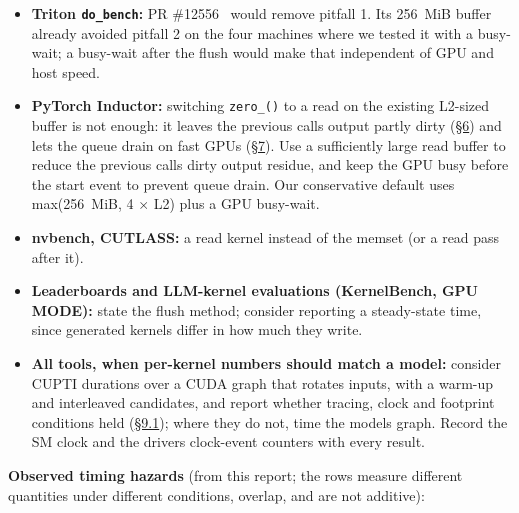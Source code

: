 \documentclass[11pt,a4paper]{article}
\providecommand{\tightlist}{\setlength{\itemsep}{0pt}\setlength{\parskip}{0pt}}
\begin{document}
\begin{itemize}
\tightlist
\item
  \textbf{Triton \texttt{do\_\allowbreak{}bench}:} PR \#12556~\cite{tr12556} would remove pitfall 1. Its 256~MiB buffer already avoided pitfall 2 on the four
  machines where we tested it with a busy-wait; a busy-wait after the flush would make that independent of GPU and
  host speed.
\item
  \textbf{PyTorch Inductor:} switching \texttt{zero\_\allowbreak{}()} to a read on the existing L2-sized buffer is not enough: it leaves the
  previous call\textquotesingle s output partly dirty (\hyperref[what-removes-the-residue-and-what-does-not]{\S{}6}) and lets the queue drain on fast GPUs (\hyperref[pitfall-2-queue-drain]{\S{}7}). Use a sufficiently large
  read buffer to reduce the previous call\textquotesingle s dirty output residue, and keep the GPU busy before the start event to
  prevent queue drain. Our conservative default uses max(256~MiB, 4 \ensuremath{\times} L2) plus a GPU busy-wait.
\item
  \textbf{nvbench, CUTLASS:} a read kernel instead of the memset (or a read pass after it).
\item
  \textbf{Leaderboards and LLM-kernel evaluations (KernelBench, GPU MODE):} state the flush method; consider reporting a
  steady-state time, since generated kernels differ in how much they write.
\item
  \textbf{All tools, when per-kernel numbers should match a model:} consider CUPTI durations over a CUDA graph that rotates
  inputs, with a warm-up and interleaved candidates, and report whether tracing, clock and footprint conditions held
  (\hyperref[kernel-by-kernel-does-a-single-kernel-benchmark-match-the-same-kernel-inside-the-decode-proxy]{\S{}9.1}); where they do not, time the model\textquotesingle s graph. Record the SM clock and the driver\textquotesingle s clock-event counters with
  every result.
\end{itemize}

\textbf{Observed timing hazards} (from this report; the rows measure different quantities under different conditions,
overlap, and are not additive):
\end{document}
